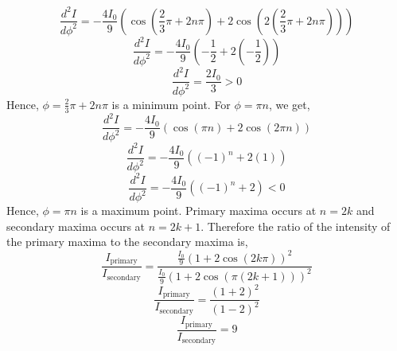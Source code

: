 \documentclass{article}
\theoremstyle{mytheoremstyle}
\theoremstyle{mytheoremstyle}
\theoremstyle{myproblemstyle}
\begin{document}
\begin{problem}[Intensity]
\begin{enumerate}
	      \[\frac{d^2I}{d\phi^2} = -\frac{4I_0}{9}\left(\cos{\left(\frac{2}{3}\pi+2n\pi\right)}+2\cos{\left(2\left(\frac{2}{3}\pi+2n\pi\right)\right)}\right)\]
	      \[\frac{d^2I}{d\phi^2} = -\frac{4I_0}{9}\left(-\frac{1}{2}+2\left(-\frac{1}{2}\right)\right)\]
	      \[\frac{d^2I}{d\phi^2} = \frac{2I_0}{3}>0\]
	      Hence, \(\phi=\frac{2}{3}\pi+2n\pi\) is a minimum point. For \(\phi=\pi n\), we get,
	      \[\frac{d^2I}{d\phi^2} = -\frac{4I_0}{9}\left(\cos{\left(\pi n\right)}+2\cos{\left(2\pi n\right)}\right)\]
	      \[\frac{d^2I}{d\phi^2} = -\frac{4I_0}{9}\left((-1)^n+2\left(1\right)\right)\]
	      \[\frac{d^2I}{d\phi^2} = -\frac{4I_0}{9}\left((-1)^n+2\right)<0\]
	      Hence, \(\phi=\pi n\) is a maximum point. Primary maxima occurs at \(n=2k\) and secondary maxima occurs at \(n=2k+1\). Therefore the ratio of the intensity of the primary maxima to the secondary maxima is,
	      \[\frac{I_{\text{primary}}}{I_{\text{secondary}}} = \frac{\frac{I_0}{9}\left(1+2\cos{\left(2k\pi\right)}\right)^2}{\frac{I_0}{9}\left(1+2\cos{\left(\pi\left(2k+1\right)\right)}\right)^2}\]
	      \[\frac{I_{\text{primary}}}{I_{\text{secondary}}} = \frac{\left(1+2\right)^2}{\left(1-2\right)^2}\]
	      \[\frac{I_{\text{primary}}}{I_{\text{secondary}}} = 9\]
\end{enumerate}

\end{problem}
\end{document}
